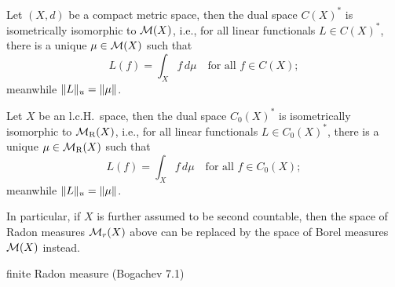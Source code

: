 \begin{namedthm}
    Let $(X,d)$ be a compact metric space, then the dual space $C(X)^*$ is isometrically isomorphic to $\mathcal{M}(X)$, i.e., for all linear functionals $L \in C(X)^*$, there is a unique $\mu \in \mathcal{M}(X)$ such that \[
        L(f) = \int_X f\,d\mu\quad \text{for all }f\in C(X);
    \] meanwhile $\lVert L \rVert_{u} = \lVert \mu \rVert$.
\end{namedthm}

\begin{namedthm}
    Let $X$ be an l.c.H.\ space, then the dual space $C_0(X)^*$ is isometrically isomorphic to $\mathcal{M}_\mathrm{R}(X)$, i.e., for all linear functionals $L \in C_0(X)^*$, there is a unique $\mu \in \mathcal{M}_\mathrm{R}(X)$ such that \[
        L(f) = \int_X f\,d\mu\quad \text{for all }f\in C_0(X);
    \] meanwhile $\lVert L \rVert_{u} = \lVert \mu \rVert$.

    In particular, if $X$ is further assumed to be second countable, then the space of Radon measures $\mathcal{M}_r(X)$ above can be replaced by the space of Borel measures $\mathcal{M}(X)$ instead.
\end{namedthm}

finite Radon measure (Bogachev 7.1)